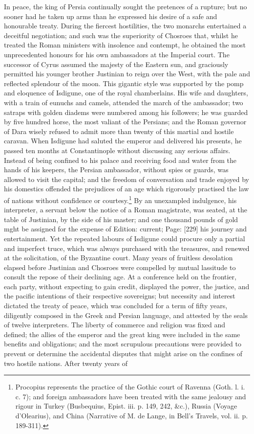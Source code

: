 In peace, the king of Persia continually sought the pretences of a rupture; but no sooner had he taken up arms than he expressed his desire of a safe and honourable treaty. During the fiercest hostilities, the two monarchs entertained a deceitful negotiation; and such was the superiority of Chosroes that, whilst he treated the Roman ministers with insolence and contempt, he obtained the most unprecedented honours for his own ambassadors at the Imperial court. The successor of Cyrus assumed the majesty of the Eastern sun, and graciously permitted his younger brother Justinian to reign over the West, with the pale and reflected splendour of the moon. This gigantic style was supported by the pomp and eloquence of Isdigune, one of the royal chamberlains. His wife and daughters, with a train of eunuchs and camels, attended the march of the ambassador; two satraps with golden diadems were numbered among his followers; he was guarded by five hundred horse, the most valiant of the Persians; and the Roman governor of Dara wisely refused to admit more than twenty of this martial and hostile caravan. When Isdigune had saluted the emperor and delivered his presents, he passed ten months at Constantinople without discussing any serious affairs. Instead of being confined to his palace and receiving food and water from the hands of his keepers, the Persian ambassador, without spies or guards, was allowed to visit the capital; and the freedom of conversation and trade enjoyed by his domestics offended the prejudices of an age which rigorously practised the law of nations without confidence or courtesy.\footnote{Procopius represents the practice of the Gothic court of Ravenna (Goth. l. i. c. 7); and foreign ambassadors have been treated with the same jealousy and rigour in Turkey (Busbequius, Epist. iii. p. 149, 242, \&c.), Russia (Voyage d\texthebrew{}’Olearius), and China (Narrative of M. de Lange, in Bell\texthebrew{}’s Travels, vol. ii. p. 189-311).} By an unexampled indulgence, his interpreter, a servant below the notice of a Roman magistrate, was seated, at the table of Justinian, by the side of his master; and one thousand pounds of gold mght be assigned for the expense of Edition: current; Page: [229] his journey and entertainment. Yet the repeated labours of Isdigune could procure only a partial and imperfect truce, which was always purchased with the treasures, and renewed at the solicitation, of the Byzantine court. Many years of fruitless desolation elapsed before Justinian and Chosroes were compelled by mutual lassitude to consult the repose of their declining age. At a conference held on the frontier, each party, without expecting to gain credit, displayed the power, the justice, and the pacific intentions of their respective sovereigns; but necessity and interest dictated the treaty of peace, which was concluded for a term of fifty years, diligently composed in the Greek and Persian language, and attested by the seals of twelve interpreters. The liberty of commerce and religion was fixed and defined; the allies of the emperor and the great king were included in the same benefits and obligations; and the most scrupulous precautions were provided to prevent or determine the accidental disputes that might arise on the confines of two hostile nations. After twenty years of 